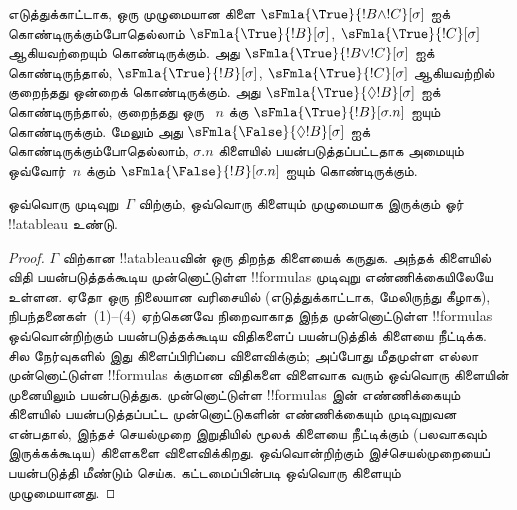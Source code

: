 \documentclass[../../../include/open-logic-section]{subfiles}
\begin{document}
\begin{explain}
எடுத்துக்காட்டாக, ஒரு முழுமையான கிளை
$\sFmla{\True}{!B \land !C}[\sigma]$ ஐக் கொண்டிருக்கும்போதெல்லாம்
$\sFmla{\True}{!B}[\sigma]$, $\sFmla{\True}{!C}[\sigma]$ ஆகியவற்றையும்
கொண்டிருக்கும். அது $\sFmla{\True}{!B \lor !C}[\sigma]$ ஐக் கொண்டிருந்தால்,
$\sFmla{\True}{!B}[\sigma]$, $\sFmla{\True}{!C}[\sigma]$ ஆகியவற்றில்
குறைந்தது ஒன்றைக் கொண்டிருக்கும். அது
{$\sFmla{\True}{\Diamond !B}[\sigma]$} ஐக் கொண்டிருந்தால், குறைந்தது ஒரு
~$n$ க்கு 
{$\sFmla{\True}{!B}[\sigma.n]$} ஐயும் கொண்டிருக்கும். மேலும் அது
{$\sFmla{\False}{\Diamond !B}[\sigma]$} ஐக் கொண்டிருக்கும்போதெல்லாம்,
$\sigma.n$ கிளையில் பயன்படுத்தப்பட்டதாக அமையும் ஒவ்வோர்~$n$ க்கும்
{$\sFmla{\False}{!B}[\sigma.n]$} ஐயும் கொண்டிருக்கும்.
\end{explain}

\begin{prop}
  ஒவ்வொரு முடிவுறு~$\Gamma$ விற்கும், ஒவ்வொரு கிளையும் முழுமையாக இருக்கும்
  ஓர் !!a{tableau} உண்டு.
\end{prop}

\begin{proof}
  $\Gamma$ விற்கான !!a{tableau}வின் ஒரு திறந்த கிளையைக் கருதுக. அந்தக்
  கிளையில் விதி பயன்படுத்தக்கூடிய முன்னொட்டுள்ள !!{formula}s முடிவுறு
  எண்ணிக்கையிலேயே உள்ளன. ஏதோ ஒரு நிலையான வரிசையில் (எடுத்துக்காட்டாக,
  மேலிருந்து கீழாக), நிபந்தனைகள்~(1)--(4) ஏற்கெனவே நிறைவாகாத இந்த
  முன்னொட்டுள்ள !!{formula}s ஒவ்வொன்றிற்கும் பயன்படுத்தக்கூடிய விதிகளைப்
  பயன்படுத்திக் கிளையை நீட்டிக்க. சில நேர்வுகளில் இது கிளைப்பிரிப்பை
  விளைவிக்கும்; அப்போது மீதமுள்ள எல்லா முன்னொட்டுள்ள !!{formula}s க்குமான
  விதிகளை விளைவாக வரும் ஒவ்வொரு கிளையின் முனையிலும் பயன்படுத்துக.
  முன்னொட்டுள்ள !!{formula}s இன் எண்ணிக்கையும் கிளையில் பயன்படுத்தப்பட்ட
  முன்னொட்டுகளின் எண்ணிக்கையும் முடிவுறுவன என்பதால், இந்தச் செயல்முறை
  இறுதியில் மூலக் கிளையை நீட்டிக்கும் (பலவாகவும் இருக்கக்கூடிய) கிளைகளை
  விளைவிக்கிறது. ஒவ்வொன்றிற்கும் இச்செயல்முறையைப் பயன்படுத்தி மீண்டும்
  செய்க. கட்டமைப்பின்படி ஒவ்வொரு கிளையும்
  முழுமையானது.
\end{proof}
\end{document}
